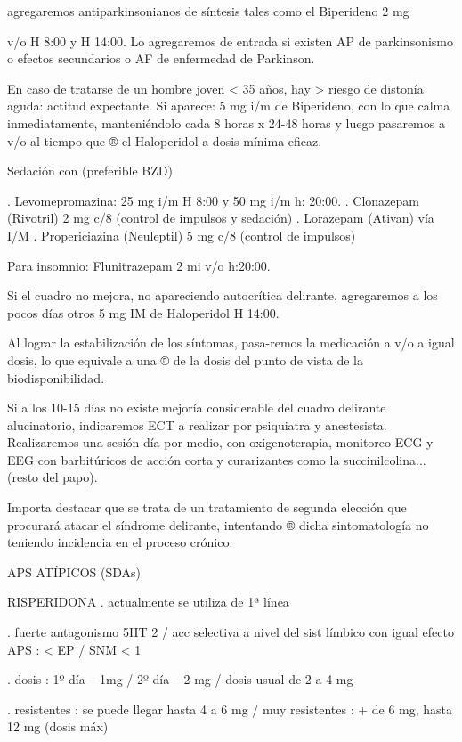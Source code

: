 \documentclass{scrbook}
\begin{document}
agregaremos antiparkinsonianos de síntesis tales como el Biperideno 2 mg

v/o H 8:00 y H 14:00. Lo agregaremos de entrada si existen AP de parkinsonismo o efectos secundarios o AF de enfermedad de Parkinson.

En caso de tratarse de un hombre joven < 35 años, hay > riesgo de distonía aguda: actitud expectante. Si aparece: 5 mg i/m de Biperideno, con lo que calma inmediatamente, manteniéndolo cada 8 horas x 24-48 horas y luego pasaremos a v/o al tiempo que ® el Haloperidol a dosis mínima eficaz.

Sedación con (preferible BZD)

. Levomepromazina: 25 mg i/m H 8:00 y 50 mg i/m h: 20:00.
. Clonazepam (Rivotril) 2 mg c/8 (control de impulsos y sedación)
. Lorazepam (Ativan) vía I/M
. Propericiazina (Neuleptil) 5 mg c/8 (control de impulsos)

Para insomnio: Flunitrazepam 2 mi v/o h:20:00.

Si el cuadro no mejora, no apareciendo autocrítica delirante, agregaremos a los pocos días otros 5 mg IM de Haloperidol H 14:00.

Al lograr la estabilización de los síntomas, pasa-remos la medicación a v/o a igual dosis, lo que equivale a una ® de la dosis del punto de vista de la biodisponibilidad.

Si a los 10-15 días no existe mejoría considerable del cuadro delirante alucinatorio, indicaremos ECT a realizar por psiquiatra y anestesista. Realizaremos una sesión día por medio, con oxigenoterapia, monitoreo ECG y EEG con barbitúricos de acción corta y curarizantes como la succinilcolina... (resto del papo).

Importa destacar que se trata de un tratamiento de segunda elección que procurará atacar el síndrome delirante, intentando ® dicha sintomatología no teniendo incidencia en el proceso crónico.

APS ATÍPICOS (SDAs)

RISPERIDONA . actualmente se utiliza de 1ª línea

. fuerte antagonismo 5HT 2 / acc selectiva a nivel del sist límbico con igual efecto APS : < EP / SNM < 1%

. dosis : 1º día – 1mg / 2º día – 2 mg / dosis usual de 2 a 4 mg

. resistentes : se puede llegar hasta 4 a 6 mg / muy resistentes : + de 6 mg, hasta 12 mg (dosis máx)
\end{document}
